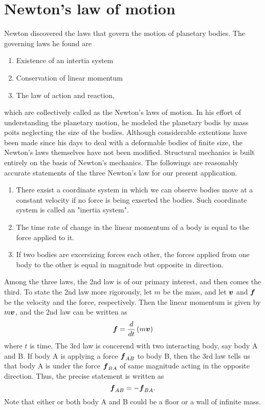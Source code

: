 \documentclass[10pt,a4j]{article}
\begin{document}
\section{Newton's law of motion}
Newton discovered the laws that govern the motion of planetary bodies. 
The governing laws he found are 
\begin{enumerate}
	\item Existence of an intertia system
	\item Conservation of linear momentum
	\item The law of action and reaction,
\end{enumerate}
which are collectively called as the Newton's laws of motion. 
In his effort of understanding the planetary motion, he modeled the planetary 
bodis by mass poits neglecting the size of the bodies. 
Although considerable extentions have been made since his days to deal with a 
 deformable bodies of finite size, the Newton's laws themselves have not been modified. 
Structural mechanics is built entirely on the basis of Newton's mechanics. 
The followings are reasonably accurate statements of the three Newton's law for our present application. 
\begin{enumerate}
\item 
	There exsist a coordinate system in which we can observe bodies move at a constant velocity 
	if no force is being exserted the bodies. Such coordinate system is called an "inertia system".
\item
	The time rate of change in the linear momentum of a body is equal to the force applied to it.
\item
	If two bodies are excersizing forces each other, the forces applied from one body to 
	the other is equal in magnitude but opposite in direction.
\end{enumerate}
Among the three laws, the 2nd law is of our primary interest, and then comes the third. 
To state the 2nd law more rigorously, let $m$ be the mass, and let $\mbox{\boldmath $v$}$ and $\mbox{\boldmath $f$}$ 
be the velocity and the force, respectively. Then the linear momentum is given by $m\mbox{\boldmath $v$}$, 
and the 2nd law can be written as 
\begin{equation}
	\mbox{\boldmath $f$}=\frac{d}{dt}\left(m\mbox{\boldmath $v$}\right)
	\label{eqn:2nd_law}
\end{equation}
where $t$ is time.
The 3rd law is concerend with two interacting body, say body A and B. 
If body A is applying a force $\mbox{\boldmath $f$}_{AB}$ to body B, 
then the 3rd law tells us that body A is under the force $\mbox{\boldmath $f$}_{BA}$ 
of same magnitude acting in the opposite direction. Thus, 
the precise statement is written as 
\begin{equation}
	\mbox{\boldmath $f$}_{AB}=-\mbox{\boldmath $f$}_{BA}.
	\label{eqn:}
\end{equation}
Note that either or both body A and B could be a floor or a wall of infinite mass. 
\end{document}
